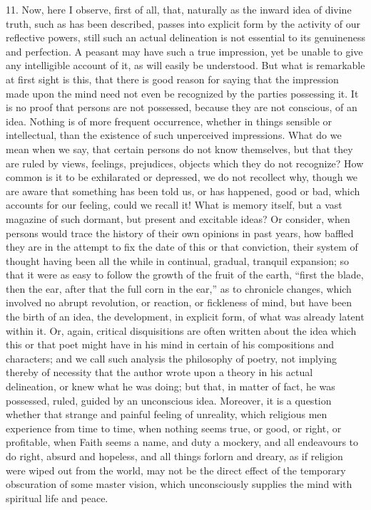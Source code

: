 11. Now, here I observe, first of all, that, naturally as the
inward idea of divine truth, such as has been described, passes into
explicit form by the activity of our reflective powers, still such an
actual delineation is not essential to its genuineness and perfection.
A peasant may have such a true impression, yet be unable to give any
intelligible account of it, as will easily be understood. But what is
remarkable at first sight is this, that there is good reason for
saying that the impression made upon the mind need not even be
recognized by the parties possessing it. It is no proof that persons
are not possessed, because they are not conscious, of an idea. Nothing
is of more frequent occurrence, whether in things sensible or
intellectual, than the existence of such unperceived impressions. What
do we mean when we say, that certain persons do not know themselves,
but that they are ruled by views, feelings, prejudices, objects which
they do not recognize? How common is it to be exhilarated or
depressed, we do not recollect why, though we are aware that something
has been told us, or has happened, good or bad, which accounts for our
feeling, could we recall it! What is memory itself, but a vast
magazine of such dormant, but present and excitable ideas? Or
consider, when persons would trace the history of their own opinions
in past years, how baffled they are in the attempt to fix the date of
this or that conviction, their system of thought having been all the
while in continual, gradual, tranquil expansion; so that it were as
easy to follow the growth of the fruit of the earth, ``first the
blade, then the ear, after that the full corn in the ear,'' as to
chronicle changes, which involved no abrupt revolution, or reaction,
or fickleness of mind, but have been the birth of an idea, the
development, in explicit form, of what was already latent within it.
Or, again, critical disquisitions are often written about the idea
which this or that poet might have in his mind in certain of his compositions and characters; and we call such analysis the philosophy
of poetry, not implying thereby of necessity that the author wrote
upon a theory in his actual delineation, or knew what he was doing;
but that, in matter of fact, he was possessed, ruled, guided by an
unconscious idea. Moreover, it is a question whether that strange and
painful feeling of unreality, which religious men experience from time
to time, when nothing seems true, or good, or right, or profitable,
when Faith seems a name, and duty a mockery, and all endeavours to do
right, absurd and hopeless, and all things forlorn and dreary, as if
religion were wiped out from the world, may not be the direct effect
of the temporary obscuration of some master vision, which
unconsciously supplies the mind with spiritual life and peace.

